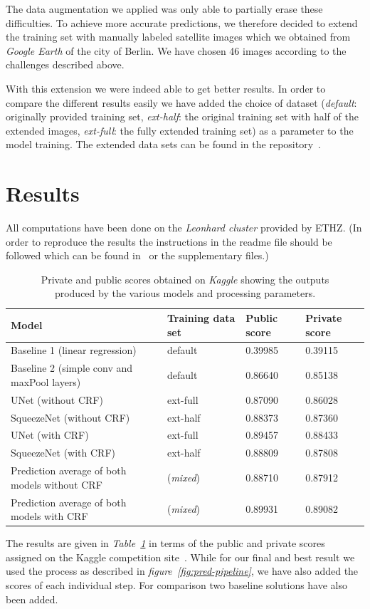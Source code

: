 \documentclass[10pt,conference,compsocconf]{IEEEtran}
\begin{document}
The data augmentation we applied was only able to partially erase these difficulties. To achieve more accurate predictions, we therefore decided to extend the training set with manually labeled satellite images which we obtained from \textit{Google Earth} of the city of Berlin. We have chosen 46 images according to the challenges described above.

With this extension we were indeed able to get better results. In order to compare the different results easily we have added the choice of dataset (\textit{default}: originally provided training set, \textit{ext-half}: the original training set with half of the extended images, \textit{ext-full}: the fully extended training set) as a parameter to the model training. The extended data sets can be found in the repository~\cite{GitRepo}.

\section{Results}
All computations have been done on the \textit{Leonhard cluster} provided by ETHZ. (In order to reproduce the results the instructions in the readme file should be followed which can be found in~\cite{GitRepo} or the supplementary files.)\\
\begin{table}[ht]
\centering
\begin{tabular}[c]{|l|l|l|l|}
  \hline
  Model&Training data set&Public score&Private score\\
  \hline
  Baseline 1 (linear regression)&default&0.39985&0.39115\\
  Baseline 2 (simple conv and maxPool layers)&default&0.86640&0.85138\\
  UNet (without CRF)&ext-full&0.87090&0.86028\\
  SqueezeNet (without CRF)&ext-half&0.88373&0.87360\\
  UNet (with CRF)&ext-full&0.89457&0.88433\\
  SqueezeNet (with CRF)&ext-half&0.88809&0.87808\\
  Prediction average of both models without CRF&(\textit{mixed})&0.88710&0.87912\\
  Prediction average of both models with CRF&(\textit{mixed})&0.89931&0.89082\\
  \hline
\end{tabular}
\captionsetup{justification=centering}
\caption{
  Private and public scores obtained on \textit{Kaggle} showing the  outputs\\
  produced by the various models and processing parameters.
}
\label{tab:scores}
\end{table}
The results are given in \textit{Table~\ref{tab:scores}} in terms of the public and private scores assigned on the Kaggle competition site~\cite{KaggleComp}. While for our final and best result we used the process as described in \textit{figure~\ref{fig:pred-pipeline}}, we have also added the scores of each individual step. For comparison two baseline solutions have also been added.
\end{document}
